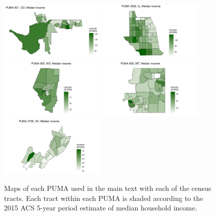 \documentclass[12pt]{article}
\begin{document}
\begin{figure}
  \centering
  \includegraphics[width = 0.45\textwidth]{median_co_map.png}
  \includegraphics[width = 0.45\textwidth]{median_il_map.png}
  \includegraphics[width = 0.45\textwidth]{median_mo_map.png}
  \includegraphics[width = 0.45\textwidth]{median_mt_map.png}
  \includegraphics[width = 0.45\textwidth]{median_ny_map.png}
  \caption{Maps of each PUMA used in the main text with each of the census tracts. Each tract within each PUMA is shaded according to the 2015 ACS 5-year period estimate of median household income.}
  \label{fig:allpumas.median}
\end{figure}

\clearpage
\end{document}
